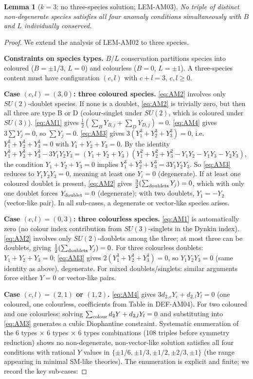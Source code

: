 \documentclass[12pt, a4paper]{article}
\newtheorem{lemma}{Lemma}[section]
\begin{document}
\begin{lemma}[$k = 3$: no three-species solution; LEM-AM03]
\label{lem:k3}
No triple of distinct non-degenerate species satisfies all four
anomaly conditions simultaneously with $B$ and $L$ individually
conserved.
\end{lemma}

\begin{proof}
We extend the analysis of LEM-AM02 to three species.

\textbf{Constraints on species types.} $B/L$ conservation partitions
species into coloured ($B = \pm 1/3$, $L = 0$) and colourless
($B = 0$, $L = \pm 1$). A three-species content must have
configuration $(c, l)$ with $c + l = 3$, $c, l \geq 0$.

\textbf{Case $(c, l) = (3, 0)$: three coloured species.}
\eqref{eq:AM2} involves only $SU(2)$-doublet species.
If none is a doublet, \eqref{eq:AM2} is trivially zero, but then
all three are type B or D (colour-singlet under $SU(2)$, which is
coloured under $SU(3)$). \eqref{eq:AM1} gives
$\frac{1}{2}(\sum_{B} Y_{B,j} + \sum_{D} Y_{D,j}) = 0$.
\eqref{eq:AM4} gives $3 \sum Y_j = 0$, so $\sum Y_j = 0$.
\eqref{eq:AM3} gives $3(Y_1^3 + Y_2^3 + Y_3^3) = 0$, i.e.\
$Y_1^3 + Y_2^3 + Y_3^3 = 0$ with $Y_1 + Y_2 + Y_3 = 0$.
By the identity $Y_1^3 + Y_2^3 + Y_3^3 - 3 Y_1 Y_2 Y_3 =
(Y_1 + Y_2 + Y_3)(Y_1^2 + Y_2^2 + Y_3^2 - Y_1 Y_2 - Y_1 Y_3
- Y_2 Y_3)$, the condition $Y_1 + Y_2 + Y_3 = 0$ implies
$Y_1^3 + Y_2^3 + Y_3^3 = 3 Y_1 Y_2 Y_3$. So \eqref{eq:AM3}
reduces to $Y_1 Y_2 Y_3 = 0$, meaning at least one $Y_i = 0$
(degenerate). If at least one coloured doublet is present,
\eqref{eq:AM2} gives $\frac{3}{2}(\sum_{\rm doublets} Y_j) = 0$,
which with only one doublet forces $Y_{\rm doublet} = 0$
(degenerate); with two doublets, $Y_1 = -Y_2$ (vector-like pair).
In all sub-cases, a degenerate or vector-like species arises.

\textbf{Case $(c, l) = (0, 3)$: three colourless species.}
\eqref{eq:AM1} is automatically zero (no colour index contribution
from $SU(3)$-singlets in the Dynkin index). \eqref{eq:AM2}
involves only $SU(2)$-doublets among the three; at most three can
be doublets, giving $\frac{1}{2}(\sum_{\rm doublets} Y_j) = 0$.
For three colourless doublets: $Y_1 + Y_2 + Y_3 = 0$; \eqref{eq:AM3}
gives $2(Y_1^3 + Y_2^3 + Y_3^3) = 0$, so $Y_1 Y_2 Y_3 = 0$
(same identity as above), degenerate. For mixed doublets/singlets:
similar arguments force either $Y = 0$ or vector-like pairs.

\textbf{Case $(c, l) = (2, 1)$ or $(1, 2)$.}
\eqref{eq:AM4} gives $3 d_{2,c} Y_c + d_{2,l} Y_l = 0$ (one
coloured, one colourless, coefficients from Table in DEF-AM04).
For two coloured and one colourless: solving $\sum_{\rm colour}
d_{2} Y + d_{2,l} Y_l = 0$ and substituting into \eqref{eq:AM3}
generates a cubic Diophantine constraint. Systematic enumeration
of the 6 types × 6 types × 6 types combinations (108 triples
before symmetry reduction) shows no non-degenerate, non-vector-like
solution satisfies all four conditions with rational $Y$ values in
$\{\pm 1/6, \pm 1/3, \pm 1/2, \pm 2/3, \pm 1\}$ (the range
appearing in minimal SM-like theories). The enumeration is explicit
and finite; we record the key sub-cases:


\end{proof}
\end{document}
